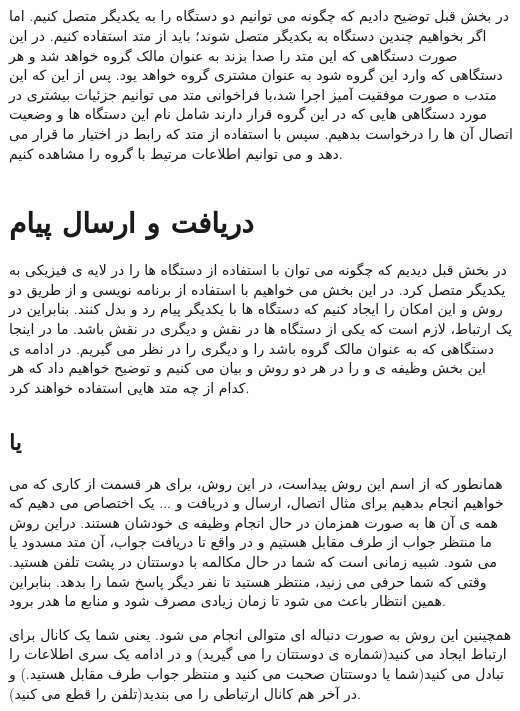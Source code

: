 \subsection{}
در بخش قبل توضیح دادیم که چگونه می توانیم دو دستگاه را به یکدیگر متصل کنیم. اما اگر بخواهیم چندین دستگاه به یکدیگر متصل شوند؛ باید از متد 
استفاده کنیم. در این صورت دستگاهی که این متد را صدا بزند به عنوان مالک گروه خواهد شد و هر دستگاهی که وارد این گروه شود به عنوان مشتری گروه خواهد یود. 
پس از این که این متدب ه صورت موفقیت آمیز اجرا شد،با فراخوانی متد
می توانیم جزئیات بیشتری در مورد دستگاهی هایی که در این گروه قرار دارند شامل نام این دستگاه ها و وضعیت اتصال آن ها را درخواست بدهیم. سپس با استفاده از متد
که رابط 
در اختیار ما قرار می دهد و می توانیم اطلاعات مرتیط با گروه را مشاهده کنیم.
\section{دریافت و ارسال پیام}
در بخش قبل دیدیم که چگونه می توان با استفاده از 
دستگاه ها را در لایه ی فیزیکی به یکدیگر متصل کرد. در این بخش می خواهیم با استفاده از برنامه نویسی 
 و از طریق دو روش 
و 
این امکان را ایجاد کنیم که دستگاه ها با یکدیگر پیام رد و بدل کنند. بنابراین در یک ارتباط، لازم است که یکی از دستگاه ها در نقش
 و دیگری در نقش
 باشد. ما در اینجا دستگاهی که به عنوان مالک گروه باشد را 
و  دیگری را 
 در نظر می گیریم. در ادامه ی این بخش وظیفه ی 
و
را در هر دو روش
و 
بیان می کنیم و توضیح خواهیم داد که هر کدام از چه متد هایی استفاده خواهند کرد.
\subsection{ یا }
همانطور که از اسم این روش پیداست، در این روش، برای هر قسمت از  کاری که می خواهیم انجام بدهیم برای مثال اتصال، ارسال و دریافت و ... یک 
اختصاص می دهیم که همه ی آن ها به صورت همزمان در حال انجام وظیفه ی خودشان هستند. 
دراین روش  ما منتظر جواب از طرف مقابل هستیم و در واقع تا دریافت جواب، آن متد مسدود یا 
می شود. شبیه زمانی است که شما در حال مکالمه با دوستتان در پشت تلفن هستید. وقتی که شما حرفی می زنید، منتظر هستید تا نفر دیگر پاسخ شما را بدهد. بنابراین همین انتظار باعث می شود تا زمان زیادی مصرف شود و منابع ما هدر برود.

همچینین این روش به صورت دنباله ای متوالی انجام می شود. یعنی شما یک کانال برای ارتباط ایجاد می کنید(شماره ی دوستتان را می گیرید) و در ادامه یک سری اطلاعات را تبادل می کنید(شما یا دوستتان صحبت می کنید و منتظر جواب طرف مقابل هستید.) و در آخر هم کانال ارتباطی را می بندید(تلفن را قطع می کنید).

